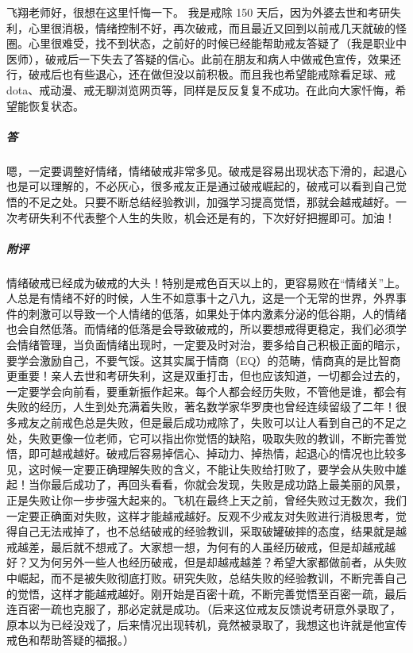 \begin{case}
    飞翔老师好，很想在这里忏悔一下。 我是戒除 150 天后，因为外婆去世和考研失利，心里很消极，情绪控制不好，再次破戒，而且最近又回到以前戒几天就破的怪圈。心里很难受，找不到状态，之前好的时候已经能帮助戒友答疑了（我是职业中医师），破戒后一下失去了答疑的信心。此前在朋友和病人中做戒色宣传，效果还行，破戒后也有些退心，还在做但没以前积极。而且我也希望能戒除看足球、戒 dota、戒动漫、戒无聊浏览网页等，同样是反反复复不成功。在此向大家忏悔，希望能恢复状态。
    \subparagraph{答} 嗯，一定要调整好情绪，情绪破戒非常多见。破戒是容易出现状态下滑的，起退心也是可以理解的，不必灰心，很多戒友正是通过破戒崛起的，破戒可以看到自己觉悟的不足之处。只要不断总结经验教训，加强学习提高觉悟，那就会越戒越好。一次考研失利不代表整个人生的失败，机会还是有的，下次好好把握即可。加油！
    \subparagraph{附评} 情绪破戒已经成为破戒的大头！特别是戒色百天以上的，更容易败在“情绪关”上。人总是有情绪不好的时候，人生不如意事十之八九，这是一个无常的世界，外界事件的刺激可以导致一个人情绪的低落，如果处于体内激素分泌的低谷期，人的情绪也会自然低落。而情绪的低落是会导致破戒的，所以要想戒得更稳定，我们必须学会情绪管理，当负面情绪出现时，一定要及时对治，要多给自己积极正面的暗示，要学会激励自己，不要气馁。这其实属于情商（EQ）的范畴，情商真的是比智商更重要！亲人去世和考研失利，这是双重打击，但也应该知道，一切都会过去的，一定要学会向前看，要重新振作起来。每个人都会经历失败，不管他是谁，都会有失败的经历，人生到处充满着失败，著名数学家华罗庚也曾经连续留级了二年！很多戒友之前戒色总是失败，但是最后成功戒除了，失败可以让人看到自己的不足之处，失败更像一位老师，它可以指出你觉悟的缺陷，吸取失败的教训，不断完善觉悟，即可越戒越好。破戒后容易掉信心、掉动力、掉热情，起退心的情况也比较多见，这时候一定要正确理解失败的含义，不能让失败给打败了，要学会从失败中雄起！当你最后成功了，再回头看看，你就会发现，失败是成功路上最美丽的风景，正是失败让你一步步强大起来的。飞机在最终上天之前，曾经失败过无数次，我们一定要正确面对失败，这样才能越戒越好。反观不少戒友对失败进行消极思考，觉得自己无法戒掉了，也不总结破戒的经验教训，采取破罐破摔的态度，结果就是越戒越差，最后就不想戒了。大家想一想，为何有的人虽经历破戒，但是却越戒越好？又为何另外一些人也经历破戒，但是却越戒越差？希望大家都做前者，从失败中崛起，而不是被失败彻底打败。研究失败，总结失败的经验教训，不断完善自己的觉悟，这样才能越戒越好。刚开始是百密十疏，不断完善觉悟至百密一疏，最后连百密一疏也克服了，那必定就是成功。（后来这位戒友反馈说考研意外录取了，原本以为已经没戏了，后来情况出现转机，竟然被录取了，我想这也许就是他宣传戒色和帮助答疑的福报。）
\end{case}

